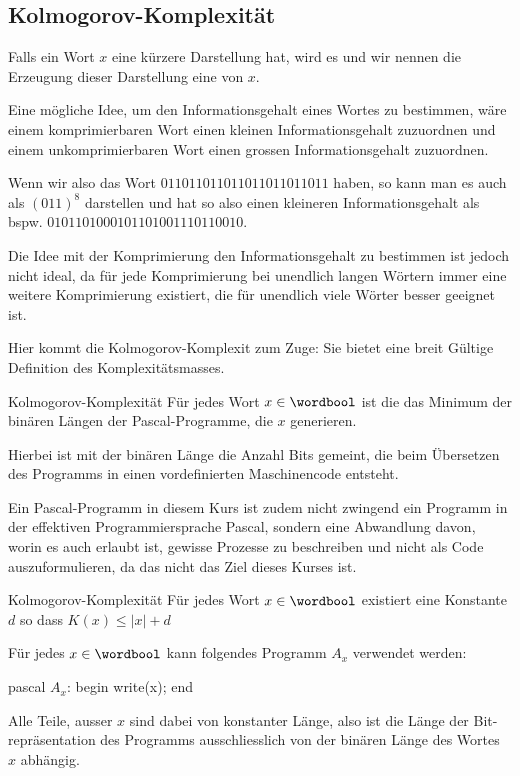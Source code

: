 \newpage
\subsection{Kolmogorov-Komplexität}
Falls ein Wort $x$ eine kürzere Darstellung hat, wird es  und wir nennen die Erzeugung dieser Darstellung eine  von $x$.

Eine mögliche Idee, um den Informationsgehalt eines Wortes zu bestimmen, wäre einem komprimierbaren Wort einen kleinen Informationsgehalt zuzuordnen und einem unkomprimierbaren Wort einen grossen Informationsgehalt zuzuordnen.

Wenn wir also das Wort $011011011011011011011011$ haben, so kann man es auch als $(011)^8$ darstellen und hat so also einen kleineren Informationsgehalt als bspw. $0101101000101101001110110010$.

Die Idee mit der Komprimierung den Informationsgehalt zu bestimmen ist jedoch nicht ideal, da für jede Komprimierung bei unendlich langen Wörtern immer eine weitere Komprimierung existiert, die für unendlich viele Wörter besser geeignet ist.

Hier kommt die Kolmogorov-Komplexit zum Zuge: Sie bietet eine breit Gültige Definition des Komplexitätsmasses.


\begin{definition}[]{Kolmogorov-Komplexität}
	Für jedes Wort $x \in \wordbool$ ist die  das Minimum der binären Längen der Pascal-Programme, die $x$ generieren.
\end{definition}

Hierbei ist mit der binären Länge die Anzahl Bits gemeint, die beim Übersetzen des Programms in einen vordefinierten Maschinencode entsteht.

Ein Pascal-Programm in diesem Kurs ist zudem nicht zwingend ein Programm in der effektiven Programmiersprache Pascal, sondern eine Abwandlung davon, worin es auch erlaubt ist, gewisse Prozesse zu beschreiben und nicht als Code auszuformulieren, da das nicht das Ziel dieses Kurses ist.


\begin{lemma}[]{Kolmogorov-Komplexität}
	Für jedes Wort $x \in \wordbool$ existiert eine Konstante $d$ so dass $K(x) \leq |x| + d$
\end{lemma}
\inlineproof Für jedes $x \in \wordbool$ kann folgendes Programm $A_x$ verwendet werden:

\begin{code}{pascal}
$A_x$: begin
        write(x);
     end
\end{code}
Alle Teile, ausser $x$ sind dabei von konstanter Länge, also ist die Länge der Bit-repräsentation des Programms ausschliesslich von der binären Länge des Wortes $x$ abhängig.


